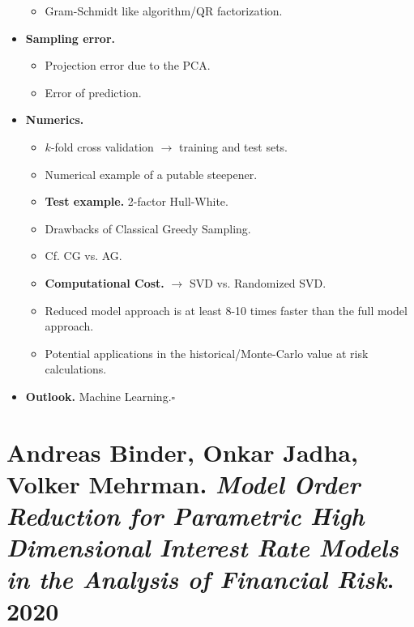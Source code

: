\documentclass{book}
\numberwithin{equation}{section}
\begin{document}
\begin{itemize}
\begin{itemize}
        \item Gram-Schmidt like algorithm/QR factorization.
    \end{itemize}
    \item \textbf{Sampling error.}
    \begin{itemize}
        \item Projection error due to the PCA.
        \item Error of prediction.
    \end{itemize}
    \item \textbf{Numerics.}
    \begin{itemize}
        \item $k$-fold cross validation $\to$ training and test sets.
        \item Numerical example of a putable steepener.
        \item \textbf{Test example.} 2-factor Hull-White.
        \item Drawbacks of Classical Greedy Sampling.
        \item Cf. CG vs. AG.
        \item \textbf{Computational Cost.} $\to$ SVD vs. Randomized SVD.
        \item Reduced model approach is at least 8-10 times faster than the full model approach.
        \item Potential applications in the historical/Monte-Carlo value at risk calculations.
    \end{itemize}
    \item \textbf{Outlook.} Machine Learning.\hfill$\square$
\end{itemize}

\section{Andreas Binder, Onkar Jadha, Volker Mehrman. \textit{Model Order Reduction for Parametric High Dimensional Interest Rate Models in the Analysis of Financial Risk}. 2020}
\end{document}
